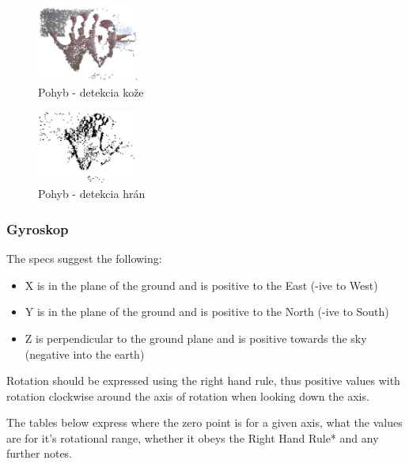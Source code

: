 \begin{figure}[H]
  \centering
  \includegraphics[width=0.3\textwidth]{img/motion/skin.png}
  \caption[Pohyb - detekcia kože]{
    Pohyb - detekcia kože}
  \label{fig: motion-skin}
\end{figure}

\begin{figure}[H]
  \centering
  \includegraphics[width=0.3\textwidth]{img/motion/edges.png}
  \caption[Pohyb - detekcia hrán]{
    Pohyb - detekcia hrán}
  \label{fig: motion-edges}
\end{figure}


\subsubsection{Gyroskop} %
\label{ssub:gyroskop}


The specs suggest the following:

\begin{itemize}
  \item X is in the plane of the ground and is positive to the East (-ive to West)
  \item Y is in the plane of the ground and is positive to the North (-ive to South)
  \item Z is perpendicular to the ground plane and is positive towards the sky (negative into the earth)
\end{itemize}

Rotation should be expressed using the right hand rule, thus positive values with rotation clockwise around the axis of rotation when looking down the axis.

The tables below express where the zero point is for a given axis, what the values are for it's rotational range, whether it obeys the Right Hand Rule* and any further notes.

